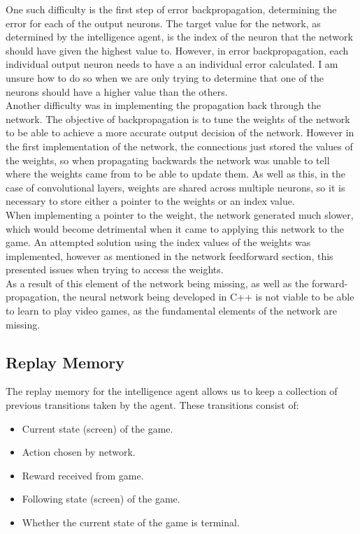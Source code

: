 \documentclass[10pt]{article}
\begin{document}
		One such difficulty is the first step of error backpropagation, determining the error for each of the output neurons. The target value for the network, as determined by the intelligence agent, is the index of the neuron that the network should have given the highest value to. However, in error backpropagation, each individual output neuron needs to have a an individual error calculated. I am unsure how to do so when we are only trying to determine that one of the neurons should have a higher value than the others.\\
		
		Another difficulty was in implementing the propagation back through the network. The objective of backpropagation is to tune the weights of the network to be able to achieve a more accurate output decision of the network. However in the first implementation of the network, the connections just stored the values of the weights, so when propagating backwards the network was unable to tell where the weights came from to be able to update them. As well as this, in the case of convolutional layers, weights are shared across multiple neurons, so it is necessary to store either a pointer to the weights or an index value.\\
		
		When implementing a pointer to the weight, the network generated much slower, which would become detrimental when it came to applying this network to the game. An attempted solution using the index values of the weights was implemented, however as mentioned in the network feedforward section, this presented issues when trying to access the weights.\\
		
		As a result of this element of the network being missing, as well as the forward-propagation, the neural network being developed in C++ is not viable to be able to learn to play video games, as the fundamental elements of the network are missing.
	\medskip
	
	\subsection{Replay Memory}
		The replay memory for the intelligence agent allows us to keep a collection of previous transitions taken by the agent. These transitions consist of:
		\begin{itemize}
			\item Current state (screen) of the game.
			\item Action chosen by network.
			\item Reward received from game.
			\item Following state (screen) of the game.
			\item Whether the current state of the game is terminal.
		\end{itemize}
		
\end{document}
